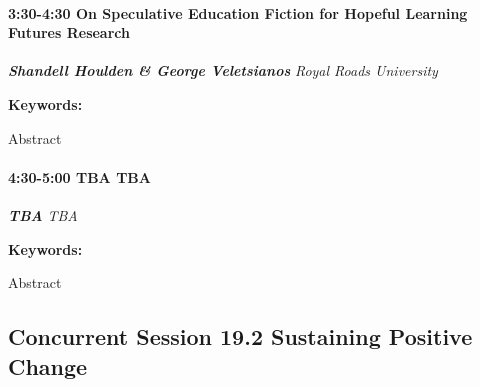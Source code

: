 \documentclass[
]{book}
\begin{document}
\begin{session}
\hypertarget{on-speculative-education-fiction-for-hopeful-learning-futures-research}{%
\paragraph*{\texorpdfstring{3:30-4:30 \textbar{} \textbf{On Speculative
Education Fiction for Hopeful Learning Futures} \textbar{}
Research}{3:30-4:30 \textbar{} On Speculative Education Fiction for Hopeful Learning Futures \textbar{} Research}}\label{on-speculative-education-fiction-for-hopeful-learning-futures-research}}

\textbf{\emph{Shandell Houlden \& George Veletsianos}} \textbar{}
\emph{Royal Roads University}

\textbf{Keywords:}

Abstract
\end{session}

\begin{session}
\hypertarget{tba-tba}{%
\paragraph*{\texorpdfstring{4:30-5:00 \textbar{} \textbf{TBA} \textbar{}
TBA}{4:30-5:00 \textbar{} TBA \textbar{} TBA}}\label{tba-tba}}

\textbf{\emph{TBA}} \textbar{} \emph{TBA}

\textbf{Keywords:}

Abstract
\end{session}

\hypertarget{concurrent-session-19.2-sustaining-positive-change}{%
\subsection*{Concurrent Session 19.2 \textbar{} Sustaining Positive Change}\label{concurrent-session-19.2-sustaining-positive-change}}
\end{document}
